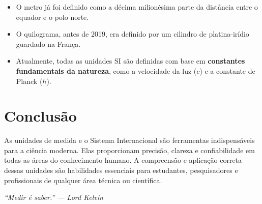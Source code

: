 \documentclass[portuguese,11pt,a4paper,oneside,onecolumn,notitlepage]{article}
\begin{document}
	\begin{itemize}
		\item O metro já foi definido como a décima milionésima parte da distância entre o equador e o polo norte.
		\item O quilograma, antes de 2019, era definido por um cilindro de platina-irídio guardado na França.
		\item Atualmente, todas as unidades SI são definidas com base em \textbf{constantes fundamentais da natureza}, como a velocidade da luz ($c$) e a constante de Planck ($h$).
	\end{itemize}
	
	\section{Conclusão}
	
	As unidades de medida e o Sistema Internacional são ferramentas indispensáveis para a ciência moderna. Elas proporcionam precisão, clareza e confiabilidade em todas as áreas do conhecimento humano. A compreensão e aplicação correta dessas unidades são habilidades essenciais para estudantes, pesquisadores e profissionais de qualquer área técnica ou científica.
	
	\vspace{0.5cm}
	\textit{“Medir é saber.” — Lord Kelvin}
	
\end{document}
